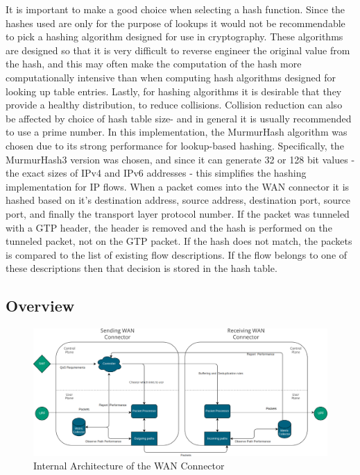It is important to make a good choice when selecting a hash function. Since the hashes used are only for the purpose of lookups it would not be recommendable to pick a hashing algorithm designed for use in cryptography. These algorithms are designed so that it is very difficult to reverse engineer the original value from the hash, and this may often make the computation of the hash more computationally intensive than when computing hash algorithms designed for looking up table entries. Lastly, for hashing algorithms it is desirable that they provide a healthy distribution, to reduce collisions. Collision reduction can also be affected by choice of hash table size- and in general it is usually recommended to use a prime number. In this implementation, the MurmurHash algorithm was chosen due to its strong performance for lookup-based hashing. Specifically, the MurmurHash3 \cite{appleby2012murmurhash3} version was chosen, and since it can generate 32 or 128 bit values - the exact sizes of IPv4 and IPv6 addresses - this simplifies the hashing implementation for IP flows. When a packet comes into the WAN connector it is hashed based on it's destination address, source address, destination port, source port, and finally the transport layer protocol number. If the packet was tunneled with a GTP header, the header is removed and the hash is performed on the tunneled packet, not on the GTP packet. If the hash does not match, the packets is compared to the list of existing flow descriptions. If the flow belongs to one of these descriptions then that decision is stored in the hash table.

\subsection{Overview}

\begin{figure}[h]
    \centering
        \includegraphics[width=\textwidth]{fig/be-architecture.png}
        \caption{Internal Architecture of the WAN Connector}
        \label{fig:arch}
\end{figure}


